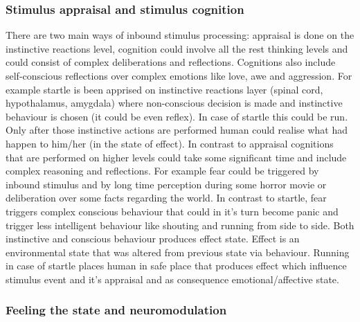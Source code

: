 \subsubsection{Stimulus appraisal and stimulus cognition}

There are two main ways of inbound stimulus processing: appraisal is done on the instinctive reactions level, cognition could involve all the rest thinking levels and could consist of complex deliberations and reflections.
Cognitions also include self-conscious reflections over complex emotions like love, awe and aggression. For example startle is been apprised on instinctive reactions layer (spinal cord, hypothalamus, amygdala) where non-conscious decision is made and instinctive behaviour is chosen (it could be even reflex). In case of startle this could be run. Only after those instinctive actions are performed human could realise what had happen to him/her (in the state of effect). In contrast to appraisal cognitions that are performed on higher levels could take some significant time and include complex reasoning and reflections. For example fear could be triggered by inbound stimulus and by long time perception during some horror movie or deliberation over some facts regarding the world. In contrast to startle, fear triggers complex conscious behaviour that could in it's turn become panic and trigger less intelligent behaviour like shouting and running from side to side. Both instinctive and conscious behaviour produces effect state. Effect is an environmental state that was altered from previous state via behaviour. Running in case of startle places human in safe place that produces effect which influence stimulus event and it's appraisal and as consequence emotional/affective state.

\subsubsection{Feeling the state and neuromodulation}

